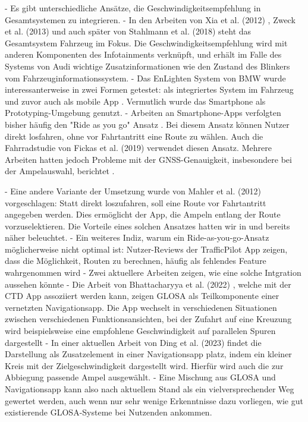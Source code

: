 - Es gibt unterschiedliche Ansätze, die Geschwindigkeitsempfehlung in Gesamtsystemen zu integrieren.
- In den Arbeiten von Xia et al. (2012) \cite{xia_field_2012}, Zweck et al. (2013) \cite{zweck_traffic_2013} und auch später von Stahlmann et al. (2018) \cite{stahlmann_exploring_2018} steht das Gesamtsystem Fahrzeug im Fokus. Die Geschwindigkeitsempfehlung wird mit anderen Komponenten des Infotainments verknüpft, und erhält im Falle des Systems von Audi wichtige Zusatzinformationen wie den Zustand des Blinkers vom Fahrzeuginformationssystem.
- Das EnLighten System von BMW wurde interessanterweise in zwei Formen getestet: als integriertes System im Fahrzeug \cite{sokolov_effects_2018} und zuvor auch als mobile App \cite{wilson_driver_2017}. Vermutlich wurde das Smartphone als Prototyping-Umgebung genutzt.
- Arbeiten an Smartphone-Apps verfolgten bisher häufig den "Ride as you go" Ansatz \cite{otto_operating_2010, koukoumidis_signalguru_2011, koukoumidis_leveraging_2012, bernais_design_2016, wilson_driver_2017, zhang_green_2020, khan_eco-drive_2021, yunex_traffic_v2x-kommunikation_2023}. Bei diesem Ansatz können Nutzer direkt losfahren, ohne vor Fahrtantritt eine Route zu wählen. Auch die Fahrradstudie von Fickas et al. (2019) \cite{fickas_fast_2019} verwendet diesen Ansatz. Mehrere Arbeiten hatten jedoch Probleme mit der GNSS-Genauigkeit, insbesondere bei der Ampelauswahl, berichtet \cite{wilson_driver_2017, stahlmann_exploring_2018, bhattacharyya_assessing_2022}.

- Eine andere Variante der Umsetzung wurde von Mahler et al. (2012) \cite{mahler_reducing_2012} vorgeschlagen: Statt direkt loszufahren, soll eine Route vor Fahrtantritt angegeben werden. Dies ermöglicht der App, die Ampeln entlang der Route vorzuselektieren. Die Vorteile eines solchen Ansatzes hatten wir in  und  bereits näher beleuchtet.
- Ein weiteres Indiz, warum ein Ride-as-you-go-Ansatz möglicherweise nicht optimal ist: Nutzer-Reviews der TrafficPilot App zeigen, dass die Möglichkeit, Routen zu berechnen, häufig als fehlendes Feature wahrgenommen wird
- Zwei aktuellere Arbeiten zeigen, wie eine solche Intgration aussehen könnte
- Die Arbeit von Bhattacharyya et al. (2022) \cite{bhattacharyya_assessing_2022}, welche mit der CTD App assoziiert werden kann, zeigen GLOSA als Teilkomponente einer vernetzten Navigationsapp. Die App wechselt in verschiedenen Situationen zwischen verschiedenen Funktionsansichten, bei der Zufahrt auf eine Kreuzung wird beispielsweise eine empfohlene Geschwindigkeit auf parallelen Spuren dargestellt
- In einer aktuellen Arbeit von Ding et al. (2023) \cite{ding_speedadv_2023} findet die Darstellung als Zusatzelement in einer Navigationsapp platz, indem ein kleiner Kreis mit der Zielgeschwindigkeit dargestellt wird. Hierfür wird auch die zur Abbiegung passende Ampel ausgewählt.
- Eine Mischung aus GLOSA und Navigationsapp kann also nach aktuellem Stand als ein vielversprechender Weg gewertet werden, auch wenn nur sehr wenige Erkenntnisse dazu vorliegen, wie gut existierende GLOSA-Systeme bei Nutzenden ankommen.

